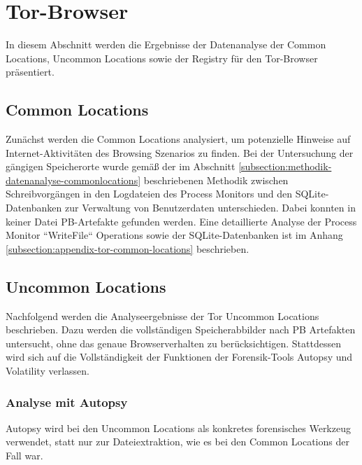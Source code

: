 

\newpage




\section{Tor-Browser}

In diesem Abschnitt werden die Ergebnisse der Datenanalyse der Common Locations, Uncommon Locations sowie der Registry für den Tor-Browser präsentiert.

\subsection*{Common Locations}
Zunächst werden die Common Locations analysiert, um potenzielle Hinweise auf Internet-Aktivitäten des Browsing Szenarios zu finden. Bei der Untersuchung der gängigen Speicherorte wurde gemäß der im Abschnitt \ref{subsection:methodik-datenanalyse-commonlocations} beschriebenen Methodik zwischen Schreibvorgängen in den Logdateien des Process Monitors und den SQLite-Datenbanken zur Verwaltung von Benutzerdaten unterschieden. Dabei konnten in keiner Datei PB-Artefakte gefunden werden. Eine detaillierte Analyse der Process Monitor ``WriteFile`` Operations sowie der SQLite-Datenbanken ist im Anhang \ref{subsection:appendix-tor-common-locations} beschrieben.

\subsection*{Uncommon Locations}
Nachfolgend werden die Analyseergebnisse der Tor Uncommon Locations beschrieben.
Dazu werden die vollständigen Speicherabbilder nach PB Artefakten untersucht, ohne das genaue Browserverhalten zu berücksichtigen. Stattdessen wird sich auf die Vollständigkeit der Funktionen der Forensik-Tools Autopsy und Volatility verlassen.

\subsubsection*{Analyse mit Autopsy}
Autopsy wird bei den Uncommon Locations als konkretes forensisches Werkzeug verwendet, statt nur zur Dateiextraktion, wie es bei den Common Locations der Fall war.

